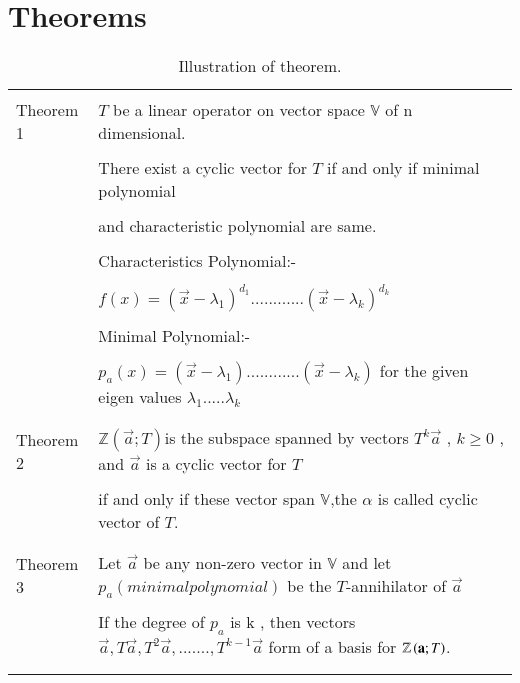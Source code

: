 \documentclass[journal,12pt]{IEEEtran}
\begin{document}
\section{\textbf{Theorems}}
\renewcommand{\thetable}{1}
\begin{longtable}{|l|l|}
\hline
\multirow{3}{*}{Theorem 1} & \\
&$T$ be a linear operator on vector space $\mathbb{V}$ of n dimensional.\\
&\\
&There exist a cyclic vector for $T$ if and only if minimal polynomial\\
&\\
&and characteristic polynomial are same.\\
&\\
&Characteristics Polynomial:-\\
&\\
&$f(x)=(\vec{x}-\lambda_1)^{d_1}............(\vec{x}-\lambda_k)^{d_k}$ \\
&\\
&Minimal Polynomial:-\\
&\\
&$p_a(x)=(\vec{x}-\lambda_1)............(\vec{x}-\lambda_k)$ for the given eigen values $\lambda_1.....\lambda_k$\\
&\\
\hline
\multirow{3}{*}{Theorem 2} & \\
&$\mathbb{Z}(\vec{a};T) $is the subspace spanned by vectors $T^k\vec{a}$ , $k\geq 0$ , and $\vec{a}$ is a cyclic vector for $T$\\
&\\
&if and only if these vector span $\mathbb{V}$,the $\alpha$ is called cyclic vector of $T$.\\ 
&\\
\hline
\multirow{3}{*}{Theorem 3} & \\
&Let $\vec{a}$ be any non-zero vector in $\mathbb{V}$ and let $p_a(minimal polynomial)$ be the $T$-annihilator of $\vec{a}$\\
Cyclic Base
&\\
&If the degree of $p_a$ is k , then vectors $\vec{a},T\vec{a},T^2\vec{a},.......,T^{k-1}\vec{a}$ form of a basis  for $\mathbb{Z}\left(\mathbf{a};T\right)$.\\
&\\
\hline
\caption{Illustration of theorem.}
\label{table:1}
\end{longtable}
\newpage
\end{document}
